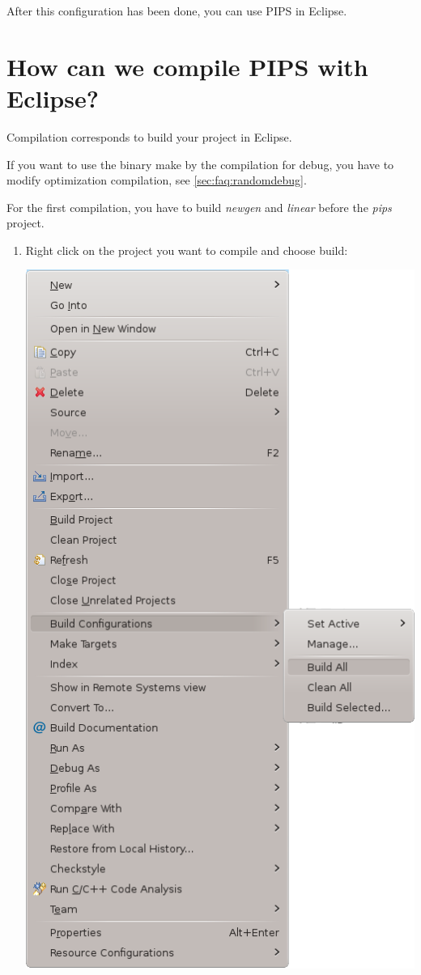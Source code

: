\documentclass[a4paper]{article}
\begin{document}
After this configuration has been done, you can use PIPS in Eclipse.

\newpage

\section{How can we compile PIPS with Eclipse?}

Compilation corresponds to build your project in Eclipse.

If you want to use the binary make by the compilation for debug, you have to modify optimization compilation, see \ref{sec:faq:randomdebug}.

For the first compilation, you have to build \emph{newgen} and \emph{linear} before the \emph{pips} project.

\begin{enumerate}
\item Right click on the project you want to compile and choose build:
\begin{center}
\noindent
\includegraphics[scale=0.4]{eclipse/06-eclipseJUNO-build1.png}
\end{center}


\end{enumerate}
\end{document}
